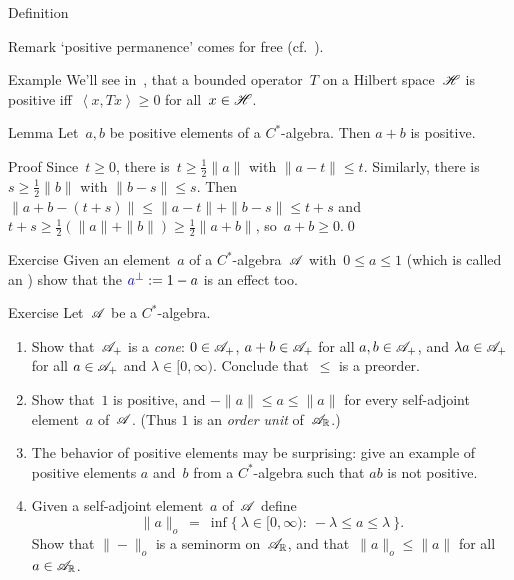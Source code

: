 \documentclass[a]{subfiles}
\begin{document}
\begin{parsec}
\begin{point}{Definition}
\begin{point}{Remark}
`positive permanence' comes for free (cf.~).
\end{point}
\end{point}
\begin{point}{Example}%
We'll see in~,
that a bounded operator~$T$ on a Hilbert space~$\mathscr{H}$
is positive iff~$\left<x,Tx\right>\geq 0$ for all~$x\in\mathscr{H}$.
\end{point}
\begin{point}{Lemma}%
Let~$a,b$ be positive elements of a $C^*$-algebra.
Then $a+b$ is positive.
\begin{point}{Proof}
Since~$t\geq 0$,
there is~$t\geq \frac{1}{2}\|a\|$ with $\|a-t\|\leq t$.
Similarly, there is~$s\geq \frac{1}{2}\|b\|$
with $\|b-s\|\leq s$.
Then $\|a+b-(t+s)\|\leq \|a-t\|+\|b-s\|\leq t+s$
and $t+s\geq \frac{1}{2}(\|a\|+\|b\|) \geq \frac{1}{2}\|a+b\|$,
so~$a+b\geq 0$.\qed
\end{point}
\end{point}
\begin{point}{Exercise}%
Given an element~$a$
of a $C^*$-algebra~$\mathscr{A}$
with~$0\leq a\leq 1$
(which is called an )%
show that 
the  $\Define{a^\perp} :=1-a$%
%
is an effect too.
\end{point}
\begin{point}{Exercise}%
Let~$\mathscr{A}$ be a $C^*$-algebra.
\begin{enumerate}
\item
Show that~$\mathscr{A}_{+}$ is a \emph{cone}:
$0\in \mathscr{A}_{+}$,
$a+b\in \mathscr{A}_{+}$ for all $a,b\in\mathscr{A}_{+}$,
and
$\lambda a\in \mathscr{A}_{+}$  
for all $a\in \mathscr{A}_{+}$ and $\lambda\in [0,\infty)$.
Conclude that~$\leq$ is a preorder.
\item
Show that~$1$ is positive, and  $-\|a\|\leq a \leq \|a\|$
for every self-adjoint element~$a$ of~$\mathscr{A}$.
(Thus $1$ is an \emph{order unit} of~$\mathscr{A}_{\mathbb{R}}$.)
\item
The behavior of positive elements may be surprising:
give an example of positive elements $a$ and~$b$
from a $C^*$-algebra
such that $ab$ is not positive.
\item
Given a self-adjoint element~$a$ of~$\mathscr{A}$ define
\begin{equation*}
\|a\|_o \ = \ \inf\{\ \lambda\in[0,\infty)\colon \ 
-\lambda\leq a\leq \lambda\ \}.
\end{equation*}
Show that $\|-\|_o$ is a seminorm on~$\mathscr{A}_{\mathbb{R}}$,
and that~$\|a\|_o\leq \|a\|$
for all~$a\in\mathscr{A}_{\mathbb{R}}$.


\end{enumerate}
\end{point}
\end{parsec}
\end{document}

